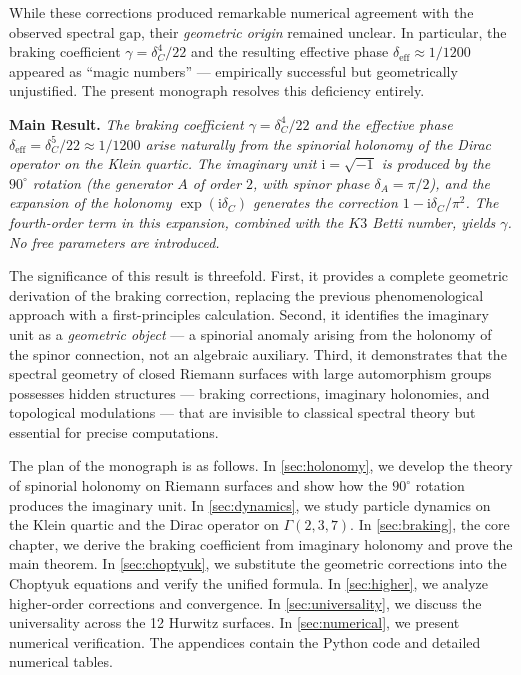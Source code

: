 \documentclass[12pt,a4paper]{article}
\theoremstyle{definition}
\theoremstyle{remark}
\newcommand{\ii}{\mathrm{i}}
\begin{document}
While these corrections produced remarkable numerical agreement with the observed spectral gap, their \emph{geometric origin} remained unclear. In particular, the braking coefficient $\gamma = \delta_C^4/22$ and the resulting effective phase $\delta_{\mathrm{eff}} \approx 1/1200$ appeared as ``magic numbers'' --- empirically successful but geometrically unjustified. The present monograph resolves this deficiency entirely.

\medskip

\noindent\textbf{Main Result.} \emph{The braking coefficient $\gamma = \delta_C^4/22$ and the effective phase $\delta_{\mathrm{eff}} = \delta_C^5/22 \approx 1/1200$ arise naturally from the spinorial holonomy of the Dirac operator on the Klein quartic. The imaginary unit $\ii = \sqrt{-1}$ is produced by the $90^\circ$ rotation (the generator $A$ of order $2$, with spinor phase $\delta_A = \pi/2$), and the expansion of the holonomy $\exp(\ii\delta_C)$ generates the correction $1 - \ii\delta_C/\pi^2$. The fourth-order term in this expansion, combined with the $K3$ Betti number, yields $\gamma$. No free parameters are introduced.}

The significance of this result is threefold. First, it provides a complete geometric derivation of the braking correction, replacing the previous phenomenological approach with a first-principles calculation. Second, it identifies the imaginary unit as a \emph{geometric object} --- a spinorial anomaly arising from the holonomy of the spinor connection, not an algebraic auxiliary. Third, it demonstrates that the spectral geometry of closed Riemann surfaces with large automorphism groups possesses hidden structures --- braking corrections, imaginary holonomies, and topological modulations --- that are invisible to classical spectral theory but essential for precise computations.

The plan of the monograph is as follows. In \cref{sec:holonomy}, we develop the theory of spinorial holonomy on Riemann surfaces and show how the $90^\circ$ rotation produces the imaginary unit. In \cref{sec:dynamics}, we study particle dynamics on the Klein quartic and the Dirac operator on $\Gamma(2,3,7)$. In \cref{sec:braking}, the core chapter, we derive the braking coefficient from imaginary holonomy and prove the main theorem. In \cref{sec:choptyuk}, we substitute the geometric corrections into the Choptyuk equations and verify the unified formula. In \cref{sec:higher}, we analyze higher-order corrections and convergence. In \cref{sec:universality}, we discuss the universality across the 12 Hurwitz surfaces. In \cref{sec:numerical}, we present numerical verification. The appendices contain the Python code and detailed numerical tables.
\end{document}
